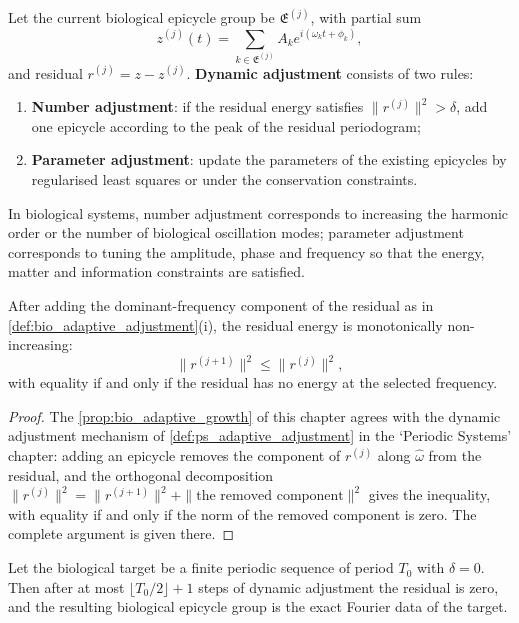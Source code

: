 \begin{definition}\label{def:bio_adaptive_adjustment}
Let the current biological epicycle group be $\mathfrak E^{(j)}$, with partial sum
\[
z^{(j)}(t)=\sum_{k\in\mathfrak E^{(j)}}A_k e^{i(\omega_k t+\phi_k)},
\]
and residual $r^{(j)}=z-z^{(j)}$. \textbf{Dynamic adjustment} consists of two rules:
\begin{enumerate}[label=(\roman*)]
    \item \textbf{Number adjustment}: if the residual energy satisfies $\|r^{(j)}\|^2>\delta$, add one epicycle according to the peak of the residual periodogram;
    \item \textbf{Parameter adjustment}: update the parameters of the existing epicycles by regularised least squares or under the conservation constraints.
\end{enumerate}
In biological systems, number adjustment corresponds to increasing the harmonic order or the number of biological oscillation modes; parameter adjustment corresponds to tuning the amplitude, phase and frequency so that the energy, matter and information constraints are satisfied.
\end{definition}

\begin{proposition}\label{prop:bio_adaptive_growth}
After adding the dominant-frequency component of the residual as in \cref{def:bio_adaptive_adjustment}(i), the residual energy is monotonically non-increasing:
\[
\|r^{(j+1)}\|^2\le\|r^{(j)}\|^2,
\]
with equality if and only if the residual has no energy at the selected frequency.
\end{proposition}

\begin{proof}
The \cref{prop:bio_adaptive_growth} of this chapter agrees with the dynamic adjustment mechanism of \cref{def:ps_adaptive_adjustment} in the `Periodic Systems' chapter:
adding an epicycle removes the component of $r^{(j)}$ along $\hat\omega$ from the residual, and the orthogonal decomposition
$\|r^{(j)}\|^2=\|r^{(j+1)}\|^2+\|\text{the removed component}\|^2$ gives the inequality,
with equality if and only if the norm of the removed component is zero. The complete argument is given there.
\end{proof}

\begin{theorem}\label{thm:bio_adaptive_convergence}
Let the biological target be a finite periodic sequence of period $T_0$ with $\delta=0$. Then after at most $\lfloor T_0/2\rfloor+1$ steps of dynamic adjustment the residual is zero, and the resulting biological epicycle group is the exact Fourier data of the target.
\end{theorem}

